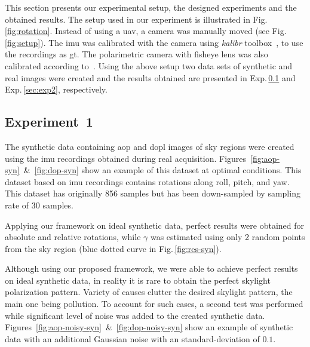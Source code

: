 This section presents our experimental setup, the designed experiments and the
obtained results. The setup used in our experiment is illustrated in
Fig.\,\ref{fig:rotation}. Instead of using a \gls{uav}, a camera was manually
moved (see Fig.\,\ref{fig:setup}). The \gls{imu} was calibrated with the camera
using \emph{kalibr} toolbox~\cite{furgale2013unified, furgale2012continuous},
to use the recordings as \gls{gt}. The polarimetric camera with fisheye lens
was also calibrated according to~\cite{kannala2006generic}.
Using the above setup two data sets of synthetic and real images were created
and the results obtained are presented in Exp.\,\ref{sec:exp1} and
Exp.\,\ref{sec:exp2}, respectively.

\subsection{Experiment~1}
\label{sec:exp1}
The synthetic data containing \gls{aop} and \gls{dopl} images of sky regions
were created using the \gls{imu} recordings obtained during real acquisition.
Figures~\ref{fig:aop-syn}~\&~\ref{fig:dop-syn} show an example of this dataset
at optimal conditions. This dataset based on \gls{imu} recordings contains
rotations along roll, pitch, and yaw. This dataset has originally 856 samples
but has been down-sampled by sampling rate of 30 samples.


Applying our framework on ideal synthetic data, perfect results were obtained
for absolute and relative rotations, while $\gamma$ was estimated using only 2
random points from the sky region (blue dotted curve in
Fig.\,\ref{fig:res-syn}).



Although using our proposed framework, we were able to achieve perfect results
on ideal synthetic data, in reality it is rare to obtain the perfect skylight
polarization pattern. Variety of causes clutter the desired skylight pattern,
the main one being pollution. To account for such cases, a second test was
performed while significant level of noise was added to the created synthetic
data. Figures~\ref{fig:aop-noisy-syn}~\&~\ref{fig:dop-noisy-syn} show an
example of synthetic data with an additional Gaussian noise with an
standard-deviation of $0.1$.

